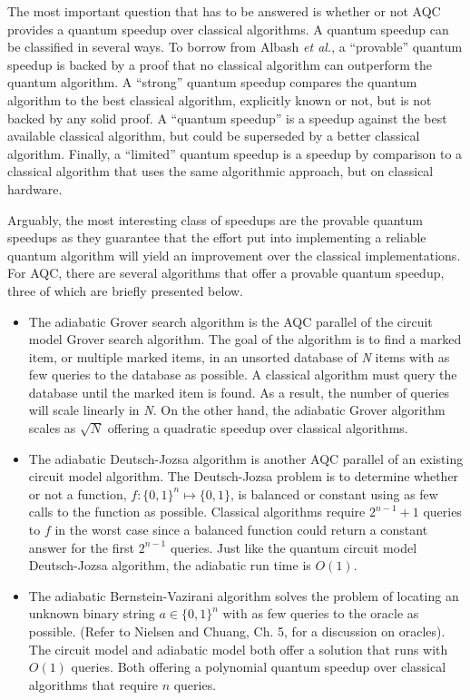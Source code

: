 \documentclass[%
 reprint,
 amsmath,amssymb,
 aps,
]{revtex4-1}
\begin{document}
   The most important question that has to be answered is whether or not AQC provides a quantum speedup over classical algorithms. A quantum speedup can be classified in several ways\cite{RevModPhys.90.015002}. To borrow from Albash \textit{et al.}, a ``provable'' quantum speedup is backed by a proof that no classical algorithm can outperform the quantum algorithm. A ``strong'' quantum speedup compares the quantum algorithm to the best classical algorithm, explicitly known or not, but is not backed by any solid proof. A ``quantum speedup'' is a speedup against the best available classical algorithm, but could be superseded by a better classical algorithm. Finally, a ``limited'' quantum speedup is a speedup by comparison to a classical algorithm that uses the same algorithmic approach, but on classical hardware.
   
   Arguably, the most interesting class of speedups are the provable quantum speedups as they guarantee that the effort put into implementing a reliable quantum algorithm will yield an improvement over the classical implementations. For AQC, there are several algorithms that offer a provable quantum speedup, three of which are briefly presented below.
   
   \begin{itemize}
   	\item The adiabatic Grover search algorithm is the AQC parallel of the circuit model Grover search algorithm. The goal of the algorithm is to find a marked item, or multiple marked items, in an unsorted database of \textit{N} items with as few queries to the database as possible. A classical algorithm must query the database until the marked item is found. As a result, the number of queries will scale linearly in \textit{N}. On the other hand, the adiabatic Grover algorithm scales as $\sqrt{N}$ offering a quadratic speedup over classical algorithms.
   \item The adiabatic Deutsch-Jozsa algorithm is another AQC parallel of an existing circuit model algorithm. The Deutsch-Jozsa problem is to determine whether or not a function, $f: \lbrace0,1\rbrace^n \longmapsto \lbrace0,1\rbrace$, is balanced or constant using as few calls to the function as possible. Classical algorithms require $2^{n-1} + 1$ queries to $f$ in the worst case since a balanced function could return a constant answer for the first $2^{n-1}$ queries. Just like the quantum circuit model Deutsch-Jozsa algorithm, the adiabatic run time is $O(1)$.
   \item The adiabatic Bernstein-Vazirani algorithm solves the problem of locating an unknown binary string $ a \in \lbrace0,1\rbrace^n  $ with as few queries to the oracle as possible. (Refer to Nielsen and Chuang, Ch. 5, for a discussion on oracles). The circuit model and adiabatic model both offer a solution that runs with $O(1)$ queries. Both offering a polynomial quantum speedup over classical algorithms that require $n$ queries.
   \end{itemize}
   
\end{document}
